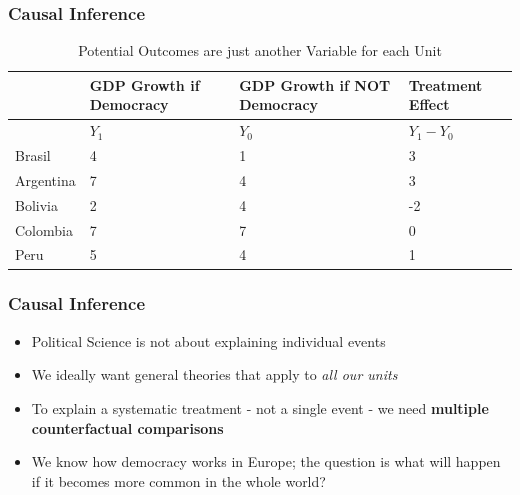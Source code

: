 \documentclass[xcolor=x11names,compress]{beamer}\usepackage[]{graphicx}\usepackage[]{color}
\renewcommand{\(}{\begin{columns}}
\renewcommand{\)}{\end{columns}}
\newcommand{\<}[1]{\begin{column}{#1}}
\renewcommand{\>}{\end{column}}
\begin{document}
\begin{frame}
\frametitle{Causal Inference}
\footnotesize
\begin{table}[htbp]
  \centering
  \caption{Potential Outcomes are just another Variable for each Unit}
    \begin{tabular}{|p{2.4cm}|p{2.4cm}|p{2.4cm}|p{2.4cm}|}
    \hline
          & \multicolumn{1}{p{2.4cm}|}{GDP Growth if Democracy} & \multicolumn{1}{p{2.4cm}|}{GDP Growth if  NOT Democracy} &  Treatment Effect\bigstrut\\
    \hline
          & \multicolumn{1}{l|}{$Y_1$} & \multicolumn{1}{l|}{$Y_0$} & \multicolumn{1}{l|}{$Y_1-Y_0$} \bigstrut\\
    \hline
    Brasil & 4     & 1     & 3 \bigstrut\\
    \hline
    Argentina & 7    & 4     & 3 \bigstrut\\
    \hline
    Bolivia & 2     & 4     & -2 \bigstrut\\
    \hline
    Colombia & 7    & 7    & 0 \bigstrut\\
    \hline
    Peru & 5     & 4     & 1 \bigstrut\\
    \hline
    \end{tabular}%
  \label{tab:addlabel}%
\end{table}%
\normalsize
\end{frame}

\begin{frame}
\frametitle{Causal Inference}
\begin{itemize}
\item Political Science is not about explaining individual events
\pause
\item We ideally want general theories that apply to \textit{all our units}
\pause
\item To explain a systematic treatment - not a single event - we need \textbf{multiple counterfactual comparisons}
\pause
\item We know how democracy works in Europe; the question is what will happen if it becomes more common in the whole world?
\pause
{}
\end{itemize}
\end{frame}
\end{document}

